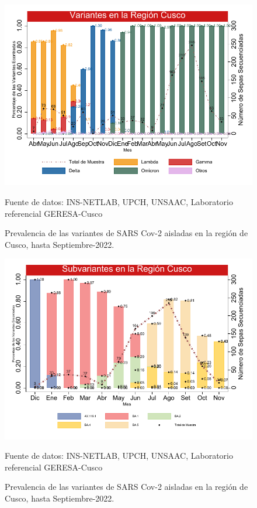 \documentclass[12pt,a4paper,openany]{book}
\begin{document}
	\begin{figure}[h]
		\caption{Prevalencia de las variantes de SARS Cov-2 aisladas en la región de Cusco, hasta Septiembre-2022. }\label{fig:variantes}
		\begin{center}
			\includegraphics[width=0.85\linewidth]{../figuras/variantes.pdf}
		\end{center}
		{\footnotesize {Fuente de datos: INS-NETLAB, UPCH, UNSAAC, Laboratorio referencial GERESA-Cusco}}
	\end{figure}

	\begin{figure}[h]
	\caption{Prevalencia de las variantes de SARS Cov-2 aisladas en la región de Cusco, hasta Septiembre-2022. }\label{fig:subvariantes}
	\begin{center}
		\includegraphics[width=0.85\linewidth]{../figuras/subvariantes.pdf}
	\end{center}
	{\footnotesize {Fuente de datos: INS-NETLAB, UPCH, UNSAAC, Laboratorio referencial GERESA-Cusco}}
\end{figure}
	
\end{document}
